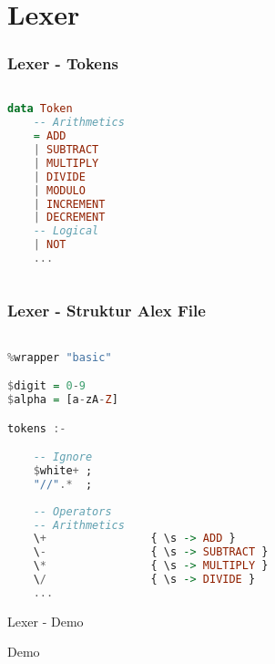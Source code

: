 \section{Lexer}

\begin{frame}[fragile]
	\frametitle{Lexer - Tokens}
	\begin{lstlisting}[language=Haskell]
		
data Token
	-- Arithmetics
	= ADD
	| SUBTRACT
	| MULTIPLY
	| DIVIDE
	| MODULO
	| INCREMENT
	| DECREMENT
	-- Logical
	| NOT	
	...	
		
	\end{lstlisting}
\end{frame}

\begin{frame}[fragile]
	\frametitle{Lexer - Struktur Alex File}
	\begin{lstlisting}[basicstyle=\tiny, language=Haskell]

%wrapper "basic"

$digit = 0-9
$alpha = [a-zA-Z]

tokens :-

	-- Ignore
	$white+ ; 
	"//".*  ;
	
	-- Operators
	-- Arithmetics
	\+                { \s -> ADD }
	\-                { \s -> SUBTRACT }
	\*                { \s -> MULTIPLY }
	\/                { \s -> DIVIDE }	
	...

	\end{lstlisting}
\end{frame}

\begin{frame}{Lexer - Demo}

\begin{center}
	\Huge Demo
\end{center}

\end{frame}